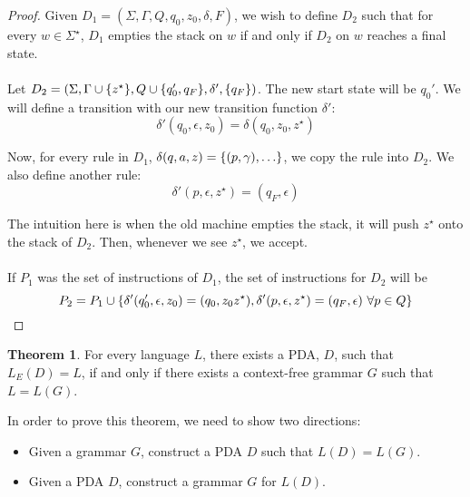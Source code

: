 \documentclass[]{article}
\DeclarePairedDelimiter{\set}{\lbrace}{\rbrace}
\theoremstyle{definition}
\newtheorem*{theorem}{Theorem}
\begin{document}
        \begin{proof}
          Given $D_1 = (\Sigma, \Gamma, Q, q_0, z_0, \delta, F)$, we wish to define $D_2$ such that for every $w \in \Sigma^\star$, $D_1$ empties the stack on $w$ if and only if $D_2$ on $w$ reaches a final state.
          \\ \\
          Let $D_2 = (\Sigma, \Gamma \cup \set{z^\star}, Q \cup \set{q_0', q_F}, \delta', \set{q_F})$. The new start state will be $q_0'$. We will define a transition with our new transition function $\delta'$:
          $$
            \delta'(q_0, \epsilon, z_0) = \delta(q_0, z_0, z^\star)
          $$

          Now, for every rule in $D_1$, $\delta(q, a, z) = \set{ (p, \gamma), \ldots }$, we copy the rule into $D_2$. We also define another rule:
          $$
            \delta'(p, \epsilon, z^\star) = (q_F, \epsilon)
          $$

          The intuition here is when the old machine empties the stack, it will push $z^\star$ onto the stack of $D_2$. Then, whenever we see $z^\star$, we accept.
          \\ \\
          If $P_1$ was the set of instructions of $D_1$, the set of instructions for $D_2$ will be
          $$
            P_2 = P_1 \cup \set{ \delta'(q_0', \epsilon, z_0) = (q_0, z_0z^\star), \delta'(p, \epsilon, z^\star) = (q_F, \epsilon) ~\forall p \in Q}
          $$
        \end{proof}

        \begin{theorem}
          For every language $L$, there exists a PDA, $D$, such that $L_E(D) = L$, if and only if there exists a context-free grammar $G$ such that $L = L(G)$.
        \end{theorem}

        In order to prove this theorem, we need to show two directions:
        \begin{itemize}
          \item Given a grammar $G$, construct a PDA $D$ such that $L(D) = L(G)$.
          \item Given a PDA $D$, construct a grammar $G$ for $L(D)$.
        \end{itemize}
\end{document}
